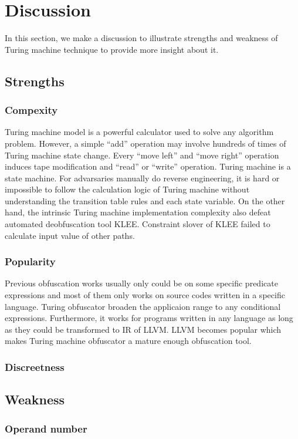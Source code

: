 \documentclass[lnicst]{svmultln}
\begin{document}
\section{Discussion}
In this section, we make a discussion to illustrate strengths and weakness of Turing machine technique to provide more insight about it.
\subsection{Strengths}
\subsubsection{Compexity}
Turing machine model is a  powerful calculator used to solve any algorithm problem. However, a simple ``add'' operation may involve hundreds of times of Turing machine state change. Every ``move left'' and ``move right'' operation induces tape modification and ``read'' or ``write'' operation. Turing machine is a state machine. For advarsaries manually do reverse engineering, it is hard or impossible to follow the calculation logic of Turing machine  without understanding the transition table rules and each state variable. On the other hand, the intrinsic Turing machine implementation complexity also defeat automated deobfuscation tool KLEE. Constraint slover of KLEE failed to calculate input value of other paths. 
\subsubsection{Popularity}
Previous obfuscation works\cite{Sharif} usually only could be on some specific predicate expressions and most of them only works on source codes written in a specific language\cite{Trans}. Turing obfuscator broaden the applicaion range to any conditional expressions. Furthermore, it works for programs written in any language as long as they could be transformed to IR of LLVM. LLVM becomes popular which makes Turing machine obfuscator a mature enough obfuscation tool.

\subsubsection{Discreetness}
\subsection{Weakness}
\subsubsection{Operand number}
\end{document}
